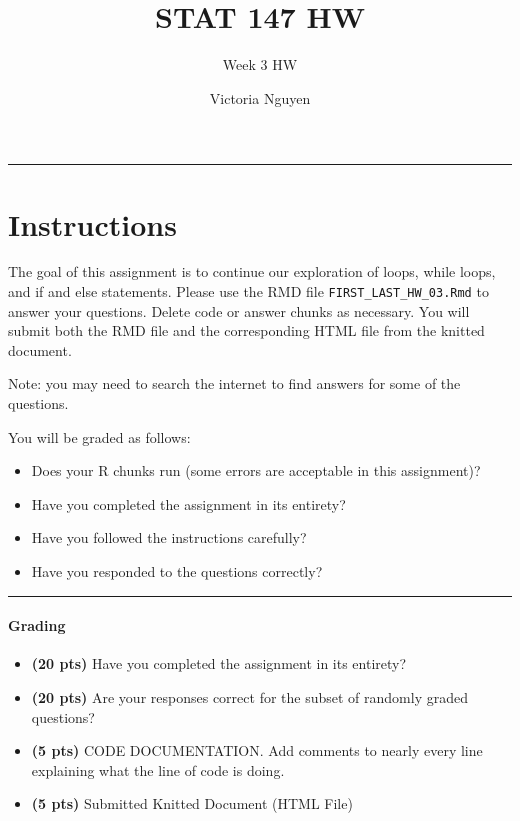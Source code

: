 \documentclass[
]{article}
\title{STAT 147 \textbar{} HW}
\subtitle{Week 3 HW}
\author{Victoria Nguyen}
\date{}
\providecommand{\tightlist}{%
  \setlength{\itemsep}{0pt}\setlength{\parskip}{0pt}}
\begin{document}
\maketitle

\begin{center}\rule{0.5\linewidth}{0.5pt}\end{center}

\hypertarget{instructions}{%
\section{\texorpdfstring{\textbf{Instructions}}{Instructions}}\label{instructions}}

The goal of this assignment is to continue our exploration of loops,
while loops, and if and else statements. Please use the RMD file
\texttt{FIRST\_LAST\_HW\_03.Rmd} to answer your questions. Delete code
or answer chunks as necessary. You will submit both the RMD file and the
corresponding HTML file from the knitted document.

Note: you may need to search the internet to find answers for some of
the questions.

You will be graded as follows:

\begin{itemize}
\tightlist
\item
  Does your R chunks run (some errors are acceptable in this
  assignment)?
\item
  Have you completed the assignment in its entirety?
\item
  Have you followed the instructions carefully?
\item
  Have you responded to the questions correctly?
\end{itemize}

\begin{center}\rule{0.5\linewidth}{0.5pt}\end{center}

\hypertarget{grading}{%
\paragraph{Grading}\label{grading}}

\begin{itemize}
\item
  \textbf{(20 pts)} Have you completed the assignment in its entirety?
\item
  \textbf{(20 pts)} Are your responses correct for the subset of
  randomly graded questions?
\item
  \textbf{(5 pts)} CODE DOCUMENTATION. Add comments to nearly every line
  explaining what the line of code is doing.
\item
  \textbf{(5 pts)} Submitted Knitted Document (HTML File)
\end{itemize}
\end{document}
